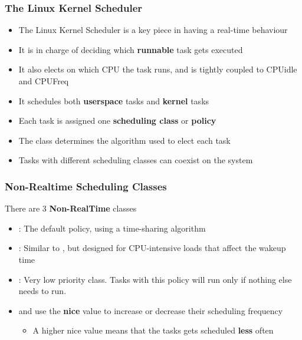 \begin{frame}
	\frametitle{The Linux Kernel Scheduler}
	\begin{itemize}
		\item The Linux Kernel Scheduler is a key piece in having a real-time behaviour
		\item It is in charge of deciding which \textbf{runnable} task gets executed
		\item It also elects on which CPU the task runs, and is tightly coupled to CPUidle and CPUFreq
		\item It schedules both \textbf{userspace} tasks and \textbf{kernel} tasks
		\item Each task is assigned one \textbf{scheduling class} or \textbf{policy}
		\item The class determines the algorithm used to elect each task
		\item Tasks with different scheduling classes can coexist on the system
	\end{itemize}
\end{frame}

\begin{frame}
	\frametitle{Non-Realtime Scheduling Classes}
	There are 3 \textbf{Non-RealTime} classes
	\begin{itemize}
		\item {}: The default policy, using a time-sharing algorithm
		\item {}: Similar to , but designed for CPU-intensive loads that affect the wakeup time
		\item {}: Very low priority class. Tasks with this policy will run only if nothing else needs to run.
		\item {} and  use the \textbf{nice} value to increase or decrease their scheduling frequency
		\begin{itemize}
			\item A higher nice value means that the tasks gets scheduled \textbf{less} often
		\end{itemize}
	\end{itemize}
\end{frame}

